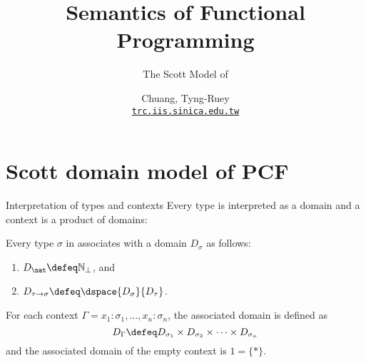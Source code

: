 \title{Semantics of Functional Programming}
\subtitle{The Scott Model of \PCF}
\author[T.-R. Chuang]{Chuang, Tyng-Ruey \\
  \href{mailto@trc.iis.sinica.edu.tw}{\texttt{trc.iis.sinica.edu.tw}}}

\frame{\maketitle}
\section{Scott domain model of PCF}  
\begin{frame}{Interpretation of types and contexts}
  Every type is interpreted as a domain and a context is a product of domains:
  \begin{definition}
  Every type $\sigma$ in \PCF{} associates with a domain $D_\sigma$ as
  follows:

    \begin{enumerate}
      \item $D_\nat \defeq \mathbb{N}_\bot$, and
      \item $D_{\tau \to \sigma} \defeq \dspace{D_\sigma}{D_{\tau}}$.
    \end{enumerate}
  \end{definition}
  \begin{definition}
    For each context $\Gamma = x_1 : \sigma_1, 
    \ldots, x_n : \sigma_n$, the associated domain is defined as
    \[
      D_\Gamma \defeq D_{\sigma_1} \times D_{\sigma_2}
      \times \dots \times D_{\sigma_n}
    \]
    and the associated domain of the empty context is $1 = \{*\}$. 
  \end{definition}
\end{frame}

